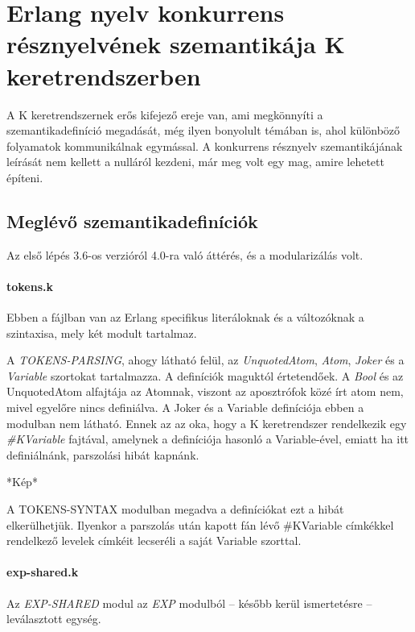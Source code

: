\section{Erlang nyelv konkurrens résznyelvének szemantikája K keretrendszerben}
A K keretrendszernek erős kifejező ereje van, ami megkönnyíti a szemantikadefiníció megadását, még ilyen bonyolult témában is, ahol különböző folyamatok kommunikálnak egymással. A konkurrens résznyelv szemantikájának leírását nem kellett a nulláról kezdeni, már meg volt egy mag, amire lehetett építeni.

\subsection{Meglévő szemantikadefiníciók}
Az első lépés 3.6-os verzióról 4.0-ra való áttérés, és a modularizálás volt.

\paragraph{tokens.k}
Ebben a fájlban van az Erlang specifikus literáloknak és a változóknak a szintaxisa, mely két modult tartalmaz.
\newline


A \textit{TOKENS-PARSING}, ahogy látható felül, az \textit{UnquotedAtom}, \textit{Atom}, \textit{Joker} és a \textit{Variable} szortokat tartalmazza. A definíciók maguktól értetendőek. A \textit{Bool} és az UnquotedAtom alfajtája az Atomnak, viszont az aposztrófok közé írt atom nem, mivel egyelőre nincs definiálva. A Joker és a Variable definíciója ebben a modulban nem látható. Ennek az az oka, hogy a K keretrendszer rendelkezik egy \textit{\#KVariable} fajtával, amelynek a definíciója hasonló a Variable-ével, emiatt ha itt definiálnánk, parszolási hibát kapnánk.


*Kép*

A TOKENS-SYNTAX modulban megadva a definíciókat ezt a hibát elkerülhetjük. Ilyenkor a parszolás után kapott fán lévő \#KVariable címkékkel rendelkező levelek címkéit lecseréli a saját Variable szorttal.

\paragraph{exp-shared.k}
Az \textit{EXP-SHARED} modul az \textit{EXP} modulból -- később kerül ismertetésre -- leválasztott egység.

